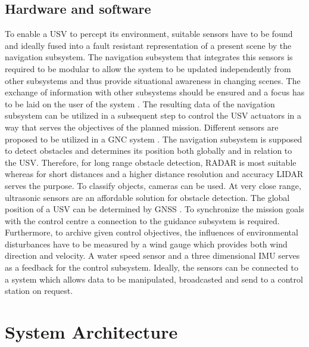  \subsection{Hardware and software} \label{ReqHardSoft}
 To enable a \ac{USV} to percept its environment, suitable sensors have to be found and ideally fused into a fault resistant representation of a present scene by the navigation subsystem.  The navigation subsystem that integrates this sensors is required to be modular to allow the system to be updated independently from other subsystems and thus provide situational awareness in changing scenes. The exchange of information with other subsystems should be ensured and a focus has to be laid on the user of the system \cite{ReqNav}. The resulting data of the navigation subsystem can be utilized in a subsequent step to control the \ac{USV} actuators in a way that serves the objectives of the planned mission. Different sensors are proposed to be utilized in a \ac{GNC} system \cite{Liu2016}. The navigation subsystem is supposed to detect obstacles and determines its position both globally and in relation to the \ac{USV}. Therefore, for long range obstacle detection, \ac{RADAR} is most suitable whereas for short distances and a higher distance resolution and accuracy \ac{LIDAR} serves the purpose. To classify objects, cameras can be used. At very close range, ultrasonic sensors are an affordable solution for obstacle detection. The global position of a \ac{USV} can be determined by \ac{GNSS} \cite{EnvPerc}. To synchronize the mission goals with the control centre a connection to the guidance subsystem is required. Furthermore, to archive given control objectives, the influences of environmental disturbances have to be measured by a wind gauge which provides both wind direction and velocity. A water speed sensor and a three dimensional \ac{IMU} serves as a feedback for the control subsystem. Ideally, the sensors can be connected to a system which allows data to be manipulated, broadcasted and send to a control station on request.\\
 
 \section{System Architecture}\label{Archi}
 
